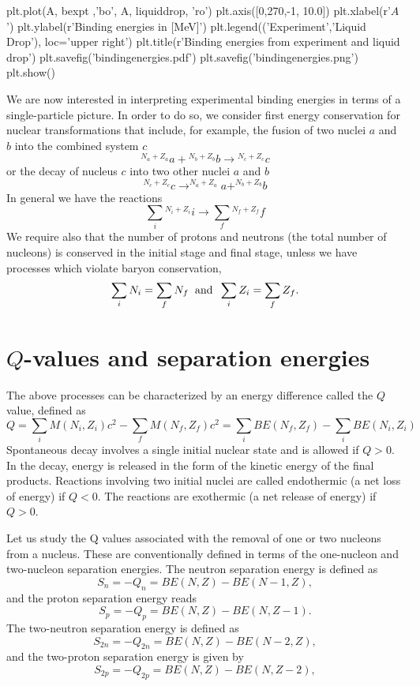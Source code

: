 \documentclass[%
twoside,                 %
final,                   %
10pt]{article}
\begin{document}
plt.plot(A, bexpt ,'bo', A, liquiddrop, 'ro')
plt.axis([0,270,-1, 10.0])
plt.xlabel(r'$A$')
plt.ylabel(r'Binding energies in [MeV]')
plt.legend(('Experiment','Liquid Drop'), loc='upper right')
plt.title(r'Binding energies from experiment and liquid drop')
plt.savefig('bindingenergies.pdf')
plt.savefig('bindingenergies.png')
plt.show()
\epypro



We are now interested in interpreting experimental binding energies  in terms of a single-particle picture.
In order to do so, we  consider first energy conservation for nuclear transformations that include, for
example, the fusion of two nuclei $a$ and $b$ into the combined system $c$
\[
{^{N_a+Z_a}}a+ {^{N_b+Z_b}}b\rightarrow {^{N_c+Z_c}}c
\]
or the decay of nucleus $c$ into two other nuclei $a$ and $b$
\[
^{N_c+Z_c}c \rightarrow  ^{N_a+Z_a}a+ ^{N_b+Z_b}b
\]
In general we have the reactions
\[
\sum_i {^{N_i+Z_i}}i \rightarrow  \sum_f {^{N_f+Z_f}}f
\]
We require also that the number of protons and neutrons (the total number of nucleons) is conserved in the initial stage and final stage, unless we have processes which violate baryon conservation, 
\[
\sum_iN_i = \sum_f N_f \hspace{0.2cm}\mathrm{and} \hspace{0.2cm}\sum_iZ_i = \sum_f Z_f.
\]


\section{$Q$-values and separation energies}

The above processes can be characterized by an energy difference called the $Q$ value, defined as
\[
Q=\sum_i M(N_i, Z_i)c^2-\sum_f M(N_f, Z_f)c^2=\sum_i BE(N_f, Z_f)-\sum_i BE(N_i, Z_i)
\]
Spontaneous decay involves a single initial nuclear state and is allowed if $Q > 0$. In the decay, energy is released in the form of the kinetic energy of the final products. Reactions involving two initial nuclei are called endothermic (a net loss of energy) if $Q < 0$. The reactions are exothermic (a net release of energy) if $Q > 0$.


Let us study the Q values associated with the removal of one or two nucleons from
a nucleus. These are conventionally defined in terms of the one-nucleon and two-nucleon
separation energies. The neutron separation energy is defined as 
\[
S_n= -Q_n= BE(N,Z)-BE(N-1,Z),
\]
and the proton separation energy reads
\[
S_p= -Q_p= BE(N,Z)-BE(N,Z-1).
\]
The two-neutron separation energy is defined as
\[
S_{2n}= -Q_{2n}= BE(N,Z)-BE(N-2,Z),
\]
and  the two-proton separation energy is given by
\[
S_{2p}= -Q_{2p}= BE(N,Z)-BE(N,Z-2),
\]
\end{document}
